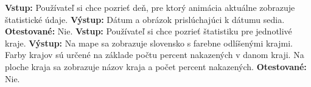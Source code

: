 \documentclass[12pt,a4paper]{report}
\begin{document}
\begin{flushleft}
	\linebreak
	\textbf{Vstup:} Používateľ si chce pozrieť deň, pre ktorý animácia aktuálne zobrazuje štatistické údaje.\linebreak
	\textbf{Výstup:} Dátum a obrázok prislúchajúci k dátumu sedia.\linebreak
	\textbf{Otestované:} Nie.\linebreak
	\linebreak
	\textbf{Vstup:} Používateľ si chce pozrieť štatistiku pre jednotlivé kraje.\linebreak
	\textbf{Výstup:} Na mape sa zobrazuje slovensko s farebne odlíšenými krajmi. Farby krajov sú určené na základe počtu percent nakazených v danom kraji. Na ploche kraja sa zobrazuje názov kraja a počet percent nakazených.\linebreak
	\textbf{Otestované:} Nie.\linebreak
\end{flushleft}
\end{document}
